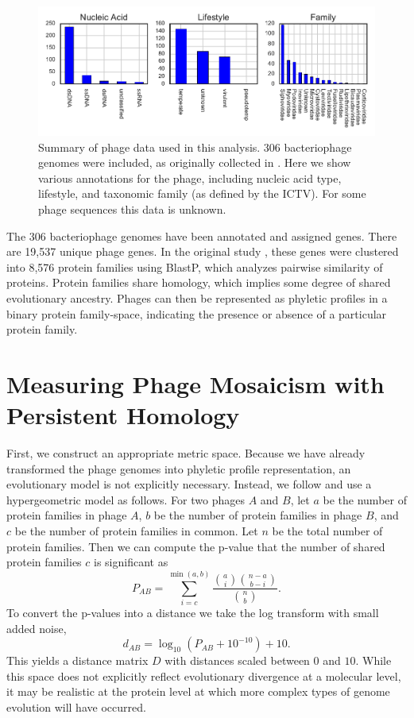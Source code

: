 \begin{figure}
\centering
\includegraphics[]{./fig/phage/phage_data_plots.pdf}
\caption[Summary of phage data used in this analysis]{Summary of phage data used in this analysis. 306 bacteriophage genomes were included, as originally collected in \cite{LimaMendez:2008ki}. Here we show various annotations for the phage, including nucleic acid type, lifestyle, and taxonomic family (as defined by the ICTV). For some phage sequences this data is unknown.}
\label{phage:fig:phage_data_plot}
\end{figure}

The 306 bacteriophage genomes have been annotated and assigned genes.
There are 19,537 unique phage genes.
In the original study \cite{LimaMendez:2008ki}, these genes were clustered into 8,576 protein families using BlastP, which analyzes pairwise similarity of proteins.
Protein families share homology, which implies some degree of shared evolutionary ancestry.
Phages can then be represented as phyletic profiles in a binary protein family-space, indicating the presence or absence of a particular protein family.

\section{Measuring Phage Mosaicism with Persistent Homology}
\label{phage:ph}

First, we construct an appropriate metric space.
Because we have already transformed the phage genomes into phyletic profile representation, an evolutionary model is not explicitly necessary.
Instead, we follow \cite{LimaMendez:2008ki} and use a hypergeometric model as follows.
For two phages $A$ and $B$, let $a$ be the number of protein families in phage $A$, $b$ be the number of protein families in phage $B$, and $c$ be the number of protein families in common.
Let $n$ be the total number of protein families.
Then we can compute the p-value that the number of shared protein families $c$ is significant as
\begin{equation}
P_{AB} = \sum_{i=c}^{\min(a,b)} \frac{\binom{a}{i}\binom{n-a}{b-i}}{\binom{n}{b}}.
\end{equation}
To convert the p-values into a distance we take the log transform with small added noise,
\begin{equation}
d_{AB} = \log_{10}(P_{AB} + 10^{-10}) + 10.
\end{equation}
This yields a distance matrix $D$ with distances scaled between $0$ and $10$.
While this space does not explicitly reflect evolutionary divergence at a molecular level, it may be realistic at the protein level at which more complex types of genome evolution will have occurred.

